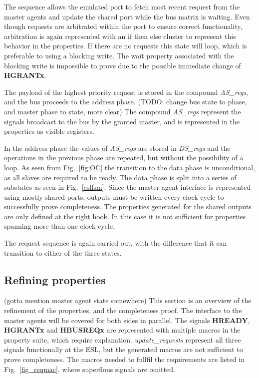 The sequence allows the emulated port to fetch most recent request from the master agents and update the shared port while the bus matrix is waiting. 
Even though requests are arbitrated within the port to ensure correct functionality, arbitration is again represented with an if then else cluster to represent this behavior in the properties. 
If there are no requests this state will loop, which is preferable to using a blocking write. The wait property associated with the blocking write is impossible to prove due to the possible immediate change of \textbf{HGRANTx}. \par
The payload of the highest priority request is stored in the compound \textit{AS\_regs}, and the bus proceeds to the address phase. (TODO: change bus state to phase, and master phase to state, more clear) 
The compound \textit{AS\_regs} represent the signals broadcast to the bus by the granted master, and is represented in the properties as visible registers. \par
In the address phase the values of \textit{AS\_regs} are stored in \textit{DS\_regs} and the operations in the previous phase are repeated, but without the possibility of a loop.
As seen from Fig.~\ref{fig:OC} the transition to the data phase is unconditional, as all slaves are required to be ready. The data phase is split into a series of substates as seen in Fig.~\ref{eslfsm}.
Since the master agent interface is represented using mostly shared ports, outputs must be written every clock cycle to successfully prove completeness. The properties generated for the shared outputs
are only defined at the right hook. In this case it is not sufficient for properties spanning more than one clock cycle. \par
The request sequence is again carried out, with the difference that it can transition to either of the three states. 
 

\subsection{Refining properties}
\label{sub:refine}
(gotta mention master agent state somewhere)
This section is an overview of the refinement of the properties, and the completeness proof. The interface to the master agents will be covered for both sides in parallel.
The signals \textbf{HREADY}, \textbf{HGRANTx} and \textbf{HBUSREQx} are represented with multiple macros in the property suite, which require explanation. 
\textit{update\_requests} represent all three signals functionally at the ESL, but the generated macros are not sufficient to prove completeness.
The macros needed to fullfil the requirements are listed in Fig.~\ref{fig_reqmac}, where superflous signals are omitted. 


